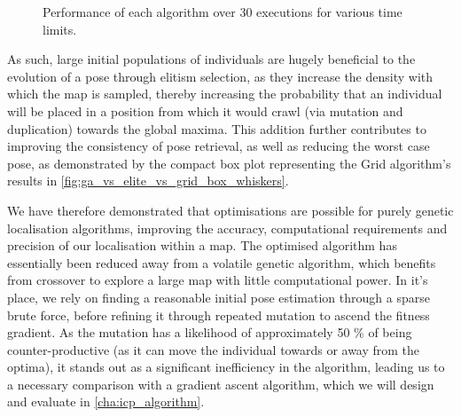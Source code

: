 \documentclass[authoryearcitations]{UoYCSproject}
\begin{document}
\begin{figure}
	\caption[Grid, Elitism, Benchmark time-adjusted performance.]{Performance of each algorithm over 30 executions for various time limits.}
	\label{fig:ga_vs_elite_vs_grid_box_whiskers}
\end{figure}

As such, large initial populations of individuals are hugely beneficial to the evolution of a pose through elitism selection, as they increase the density with which the map is sampled, thereby increasing the probability that an individual will be placed in a position from which it would crawl (via mutation and duplication) towards the global maxima. This addition further contributes to improving the consistency of pose retrieval, as well as reducing the worst case pose, as demonstrated by the compact box plot representing the Grid algorithm's results in \autoref{fig:ga_vs_elite_vs_grid_box_whiskers}. \newline

We have therefore demonstrated that optimisations are possible for purely genetic localisation algorithms, improving the accuracy, computational requirements and precision of our localisation within a map. The optimised algorithm has essentially been reduced away from a volatile genetic algorithm, which benefits from crossover to explore a large map with little computational power. In it's place, we rely on finding a reasonable initial pose estimation through a sparse brute force, before refining it through repeated mutation to ascend the fitness gradient. As the mutation has a likelihood of approximately 50 \% of being counter-productive (as it can move the individual towards or away from the optima), it stands out as a significant inefficiency in the algorithm, leading us to a necessary comparison with a gradient ascent algorithm, which we will design and evaluate in \autoref{cha:icp_algorithm}.
\end{document}

